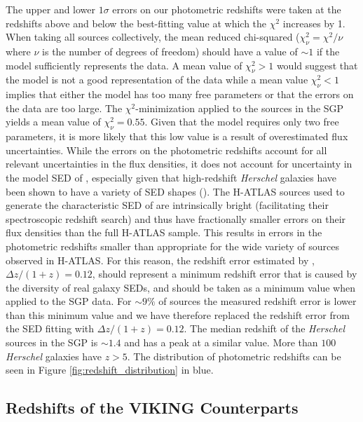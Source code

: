 The upper and lower $1\sigma$ errors on our photometric redshifts were taken at the redshifts above and below the best-fitting value at which the $\chi^2$ increases by 1. When taking all sources collectively, the mean reduced chi-squared ($\chi_\nu^2 = \chi^2/\nu$ where $\nu$ is the number of degrees of freedom) should have a value of $\sim 1$ if the model sufficiently represents the data. A mean value of $\chi_\nu^2 > 1$ would suggest that the model is not a good representation of the data while a mean value $\chi_\nu^2 < 1$ implies that either the model has too many free parameters or that the errors on the data are too large. The $\chi^2$-minimization applied to the sources in the SGP yields a mean value of $\chi_\nu^2 = 0.55$. Given that the model requires only two free parameters, it is more likely that this low value is a result of overestimated flux uncertainties. While the errors on the photometric redshifts account for all relevant uncertainties in the flux densities, it does not account for uncertainty in the model SED of \citealt{Pearson_2013}, especially given that high-redshift \textit{Herschel} galaxies have been shown to have a variety of SED shapes (\citealt{Bakx_2018}). The H-ATLAS sources used to generate the characteristic SED of \citealt{Pearson_2013} are intrinsically bright (facilitating their spectroscopic redshift search) and thus have fractionally smaller errors on their flux densities than the full H-ATLAS sample. This results in errors in the photometric redshifts smaller than appropriate for the wide variety of sources observed in H-ATLAS. For this reason, the redshift error estimated by \citealt{Pearson_2013}, $\Delta z/(1+z) = 0.12$, should represent a minimum redshift error that is caused by the diversity of real galaxy SEDs, and should be taken as a minimum value when applied to the SGP data. For $\sim 9\%$ of sources the measured redshift error is lower than this minimum value and we have therefore replaced the redshift error from the SED fitting with $\Delta z/(1+z) = 0.12$. The median redshift of the \textit{Herschel} sources in the SGP is $\sim 1.4$ and has a peak at a similar value. More than $100$ \textit{Herschel} galaxies have $z > 5$. The distribution of photometric redshifts can be seen in Figure \ref{fig:redshift_distribution} in blue.

\subsection{Redshifts of the VIKING Counterparts}
\label{sec:phot_z_VIKING}

